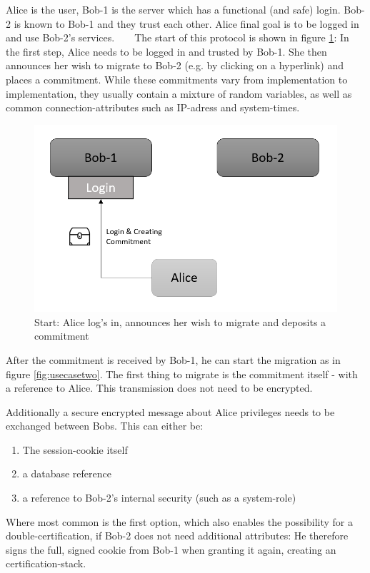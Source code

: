 Alice is the user, Bob-1 is the server which has a functional (and safe) login. Bob-2 is known to Bob-1 and they trust each other. Alice final goal is to be logged in and use Bob-2's services. 
~\newline
~\newline  
The start of this protocol is shown in figure \ref{fig:usecaseone}: In the first step, Alice needs to be logged in and trusted by Bob-1. She then announces her wish to migrate to Bob-2 (e.g. by clicking on a hyperlink) and places a commitment. While these commitments vary from implementation to implementation, they usually contain a mixture of random variables, as well as common connection-attributes such as IP-adress and system-times.   
\begin{figure} [h]
	\centering
	\includegraphics[width=0.6\linewidth]{Images/UseCaseOne}
	\caption[Protocol Start]{Start: Alice log's in, announces her wish to migrate and deposits a commitment}
	\label{fig:usecaseone}
\end{figure}
After the commitment is received by Bob-1, he can start the migration as in figure \ref{fig:usecasetwo}. The first thing to migrate is the commitment itself - with a reference to Alice. This transmission does not need to be encrypted.  

Additionally a secure encrypted message about Alice privileges needs to be exchanged between Bobs. This can either be: 
\begin{enumerate}
	\item The session-cookie itself 
	\item a database reference
	\item a reference to Bob-2's internal security (such as a system-role)
\end{enumerate}
Where most common is the first option, which also enables the possibility for a double-certification, if Bob-2 does not need additional attributes: He therefore signs the full, signed cookie from Bob-1 when granting it again, creating an certification-stack. 

